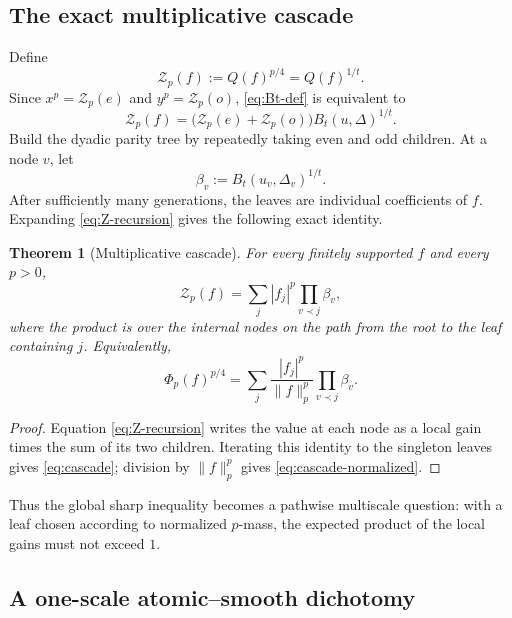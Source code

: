 \documentclass[11pt,reqno]{amsart}
\numberwithin{equation}{section}
\newtheorem{theorem}{Theorem}[section]
\theoremstyle{definition}
\theoremstyle{remark}
\newcommand{\norm}[1]{\lVert #1\rVert}
\newcommand{\cZ}{\mathcal Z}
\begin{document}
\subsection{The exact multiplicative cascade}

Define
\begin{equation}\label{eq:Zp}
  \cZ_p(f):=Q(f)^{p/4}=Q(f)^{1/t}.
\end{equation}
Since $x^p=\cZ_p(e)$ and $y^p=\cZ_p(o)$,
\eqref{eq:Bt-def} is equivalent to
\begin{equation}\label{eq:Z-recursion}
  \cZ_p(f)
  =\bigl(\cZ_p(e)+\cZ_p(o)\bigr)
   B_t(u,\Delta)^{1/t}.
\end{equation}
Build the dyadic parity tree by repeatedly taking even and odd children.
At a node $v$, let
\begin{equation}\label{eq:beta-v}
  \beta_v:=B_t(u_v,\Delta_v)^{1/t}.
\end{equation}
After sufficiently many generations, the leaves are individual coefficients
of $f$.  Expanding \eqref{eq:Z-recursion} gives the following exact identity.

\begin{theorem}[Multiplicative cascade]\label{thm:cascade}
For every finitely supported $f$ and every $p>0$,
\begin{equation}\label{eq:cascade}
  \boxed{
  \cZ_p(f)
  =\sum_j|f_j|^p\prod_{v\prec j}\beta_v,}
\end{equation}
where the product is over the internal nodes on the path from the root to
the leaf containing $j$.  Equivalently,
\begin{equation}\label{eq:cascade-normalized}
  \Phi_p(f)^{p/4}
  =\sum_j\frac{|f_j|^p}{\norm f_p^p}
    \prod_{v\prec j}\beta_v.
\end{equation}
\end{theorem}

\begin{proof}
Equation \eqref{eq:Z-recursion} writes the value at each node as a local
gain times the sum of its two children.  Iterating this identity to the
singleton leaves gives \eqref{eq:cascade}; division by $\norm f_p^p$ gives
\eqref{eq:cascade-normalized}.
\end{proof}

Thus the global sharp inequality becomes a pathwise multiscale question:
with a leaf chosen according to normalized $p$-mass, the expected product
of the local gains must not exceed $1$.

\subsection{A one-scale atomic--smooth dichotomy}
\end{document}

